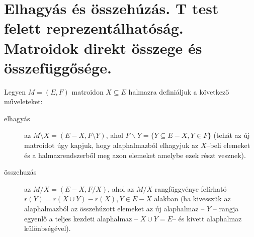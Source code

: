 \skiptooddpage \section[Elhagyás, összehúzás,
összeg,reprezentálhatóság]{Elhagyás és összehúzás. T test felett reprezentálhatóság.
Matroidok direkt összege és összefüggősége.}


Legyen $M=(E,F)$ matroidon $X \subseteq E$ halmazra definiáljuk a következő
műveleteket:
\begin{description}
  \item[elhagyás] az $M \setminus X=(E-X, F \setminus Y)$, ahol $F \backslash
  Y=\{Y\subseteq E-X, Y \in F\}$ (tehát az új matroidot úgy kapjuk, hogy
  alaphalmazból elhagyjuk az $X$--beli elemeket és a halmazrendszerből meg azon
  elemeket amelybe ezek részt vesznek).
  \item[összehuzás]  az $M / X=(E-X, F / X)$, ahol az $M/X$ rangfüggvénye felírható
  $r(Y)=r(X \cup Y) - r(X), Y \in  E-X$ alakban (ha kivesszük az alaphalmazból az
  összehúzott elemeket az új alaphalmaz -- $Y$ -- rangja egyenlő a teljes kezdeti alaphalmaz 
  -- $X \cup Y = E$-- és kivett alaphalmaz különbségével).
\end{description}

